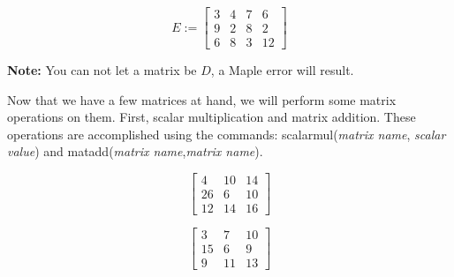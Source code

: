 \begin{maplegroup}
\begin{mapleinput}
\end{mapleinput}

\mapleresult
\begin{maplelatex}
\[
E :=  \left[ {\begin{array}{rrrr} 3 & 4 & 7 & 6 \\ 9 & 2 & 8 & 2
\\ 6 & 8 & 3 & 12
\end{array}}
 \right]
\]
\end{maplelatex}

\end{maplegroup}
\bigskip

{\bf Note:} You can not let a matrix be $D$, a Maple error will
result.

Now that we have a few matrices at hand, we will perform some
matrix operations on them. First, scalar multiplication and matrix
addition. These operations are accomplished using the commands:
scalarmul(\emph{matrix name}, \emph{scalar value}) and
matadd(\emph{matrix name},\emph{matrix name}).

\bigskip

\begin{maplegroup}
\begin{mapleinput}
\end{mapleinput}

\mapleresult
\begin{maplelatex}
\[
 \left[
{\begin{array}{rrr} 4 & 10 & 14 \\ 26 & 6 & 10 \\ 12 & 14 & 16
\end{array}}
 \right]
\]
\end{maplelatex}

\end{maplegroup}
\begin{maplegroup}
\begin{mapleinput}
\end{mapleinput}

\mapleresult
\begin{maplelatex}
\[
 \left[
{\begin{array}{rrr} 3 & 7 & 10 \\ 15 & 6 & 9 \\ 9 & 11 & 13
\end{array}}
 \right]
\]
\end{maplelatex}

\end{maplegroup}
\bigskip

